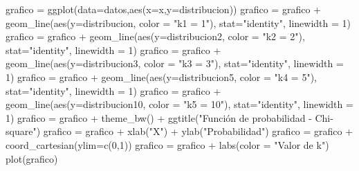 \documentclass[
]{article}
\newenvironment{Shaded}{\begin{snugshade}}{\end{snugshade}}
\newcommand{\AttributeTok}[1]{\textcolor[rgb]{0.77,0.63,0.00}{#1}}
\newcommand{\DecValTok}[1]{\textcolor[rgb]{0.00,0.00,0.81}{#1}}
\newcommand{\FunctionTok}[1]{\textcolor[rgb]{0.00,0.00,0.00}{#1}}
\newcommand{\NormalTok}[1]{#1}
\newcommand{\OtherTok}[1]{\textcolor[rgb]{0.56,0.35,0.01}{#1}}
\newcommand{\SpecialCharTok}[1]{\textcolor[rgb]{0.00,0.00,0.00}{#1}}
\newcommand{\StringTok}[1]{\textcolor[rgb]{0.31,0.60,0.02}{#1}}
\begin{document}
\begin{Shaded}
\begin{Highlighting}[]
\NormalTok{grafico }\OtherTok{=} \FunctionTok{ggplot}\NormalTok{(}\AttributeTok{data=}\NormalTok{datos,}\FunctionTok{aes}\NormalTok{(}\AttributeTok{x=}\NormalTok{x,}\AttributeTok{y=}\NormalTok{distribucion))}
\NormalTok{grafico }\OtherTok{=}\NormalTok{ grafico }\SpecialCharTok{+} \FunctionTok{geom\_line}\NormalTok{(}\FunctionTok{aes}\NormalTok{(}\AttributeTok{y=}\NormalTok{distribucion, }\AttributeTok{color =} \StringTok{"k1 = 1"}\NormalTok{), }\AttributeTok{stat=}\StringTok{"identity"}\NormalTok{, }\AttributeTok{linewidth =} \DecValTok{1}\NormalTok{)}
\NormalTok{grafico }\OtherTok{=}\NormalTok{ grafico }\SpecialCharTok{+} \FunctionTok{geom\_line}\NormalTok{(}\FunctionTok{aes}\NormalTok{(}\AttributeTok{y=}\NormalTok{distribucion2, }\AttributeTok{color =} \StringTok{"k2 = 2"}\NormalTok{), }\AttributeTok{stat=}\StringTok{"identity"}\NormalTok{, }\AttributeTok{linewidth =} \DecValTok{1}\NormalTok{)}
\NormalTok{grafico }\OtherTok{=}\NormalTok{ grafico }\SpecialCharTok{+} \FunctionTok{geom\_line}\NormalTok{(}\FunctionTok{aes}\NormalTok{(}\AttributeTok{y=}\NormalTok{distribucion3, }\AttributeTok{color =} \StringTok{"k3 = 3"}\NormalTok{), }\AttributeTok{stat=}\StringTok{"identity"}\NormalTok{, }\AttributeTok{linewidth =} \DecValTok{1}\NormalTok{)}
\NormalTok{grafico }\OtherTok{=}\NormalTok{ grafico }\SpecialCharTok{+} \FunctionTok{geom\_line}\NormalTok{(}\FunctionTok{aes}\NormalTok{(}\AttributeTok{y=}\NormalTok{distribucion5, }\AttributeTok{color =} \StringTok{"k4 = 5"}\NormalTok{), }\AttributeTok{stat=}\StringTok{"identity"}\NormalTok{, }\AttributeTok{linewidth =} \DecValTok{1}\NormalTok{)}
\NormalTok{grafico }\OtherTok{=}\NormalTok{ grafico }\SpecialCharTok{+} \FunctionTok{geom\_line}\NormalTok{(}\FunctionTok{aes}\NormalTok{(}\AttributeTok{y=}\NormalTok{distribucion10, }\AttributeTok{color =} \StringTok{"k5 = 10"}\NormalTok{), }\AttributeTok{stat=}\StringTok{"identity"}\NormalTok{, }\AttributeTok{linewidth =} \DecValTok{1}\NormalTok{)}
\NormalTok{grafico }\OtherTok{=}\NormalTok{ grafico }\SpecialCharTok{+} \FunctionTok{theme\_bw}\NormalTok{() }\SpecialCharTok{+} \FunctionTok{ggtitle}\NormalTok{(}\StringTok{"Función de probabilidad {-} Chi{-}square"}\NormalTok{)}
\NormalTok{grafico }\OtherTok{=}\NormalTok{ grafico }\SpecialCharTok{+} \FunctionTok{xlab}\NormalTok{(}\StringTok{"X"}\NormalTok{) }\SpecialCharTok{+} \FunctionTok{ylab}\NormalTok{(}\StringTok{"Probabilidad"}\NormalTok{)}
\NormalTok{grafico }\OtherTok{=}\NormalTok{ grafico }\SpecialCharTok{+} \FunctionTok{coord\_cartesian}\NormalTok{(}\AttributeTok{ylim=}\FunctionTok{c}\NormalTok{(}\DecValTok{0}\NormalTok{,}\DecValTok{1}\NormalTok{))}
\NormalTok{grafico }\OtherTok{=}\NormalTok{ grafico }\SpecialCharTok{+} \FunctionTok{labs}\NormalTok{(}\AttributeTok{color =} \StringTok{"Valor de k"}\NormalTok{)}
\FunctionTok{plot}\NormalTok{(grafico)}
\end{Highlighting}
\end{Shaded}
\end{document}
